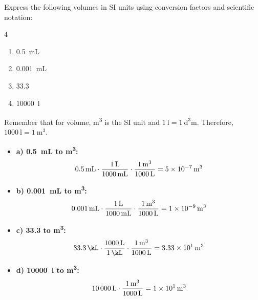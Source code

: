\begin{exercise}
\end{exercise}

\begin{exercise}
    Express the following volumes in SI units using conversion factors and scientific notation:
    \begin{multicols}{4}
        \begin{enumerate}[label=\letraminuscula]
\item \qty{0.5}{\mL}
\item \qty{0.001}{\mL}
\item \qty{33.3}{\kL}
\item \qty{10000}{\litre}
        \end{enumerate}
    \end{multicols}


    \begin{solu}
        Remember that for volume, \unit{\cubic\metre} is the SI unit and \( \qty{1}{\litre} = \qty{1}{\cubic\deci\metre} \). Therefore, \( \qty{1000}{\litre} = \qty{1}{\cubic\metre} \).
        \begin{itemize}
            \item \textbf{a) \qty{0.5}{\mL} to \unit{\cubic\metre}:}
            \[ \qty{0.5}{\cancel{\mL}} \cdot \frac{\qty{1}{\cancel{\litre}}}{\qty{1000}{\cancel{\mL}}} \cdot \frac{\qty{1}{\cubic\metre}}{\qty{1000}{\cancel{\litre}}} = \qty{5e-7}{\cubic\metre} \]
            \item \textbf{b) \qty{0.001}{\mL} to \unit{\cubic\metre}:}
            \[ \qty{0.001}{\cancel{\mL}} \cdot \frac{\qty{1}{\cancel{\litre}}}{\qty{1000}{\cancel{\mL}}} \cdot \frac{\qty{1}{\cubic\metre}}{\qty{1000}{\cancel{\litre}}} = \qty{1e-9}{\cubic\metre} \]
            \item \textbf{c) \qty{33.3}{\kL} to \unit{\cubic\metre}:}
            \[ \qty{33.3}{\cancel{\kL}} \cdot \frac{\qty{1000}{\cancel{\litre}}}{\qty{1}{\cancel{\kL}}} \cdot \frac{\qty{1}{\cubic\metre}}{\qty{1000}{\cancel{\litre}}} = \qty{3.33e1}{\cubic\metre} \]
            \item \textbf{d) \qty{10000}{\litre} to \unit{\cubic\metre}:}
            \[ \qty{10000}{\cancel{\litre}} \cdot \frac{\qty{1}{\cubic\metre}}{\qty{1000}{\cancel{\litre}}} = \qty{1e1}{\cubic\metre} \]
        \end{itemize}
    \end{solu}

\end{exercise}

